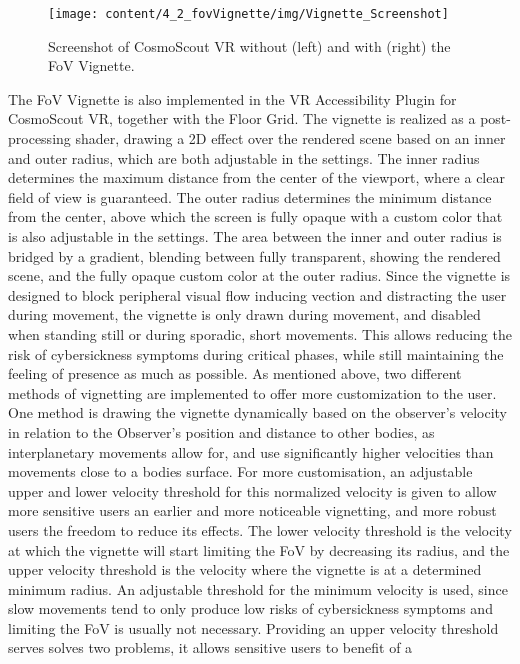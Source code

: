 \begin{figure}[h]
    \centering
    \texttt{[image: content/4\_2\_fovVignette/img/Vignette\_Screenshot]}
    \caption{Screenshot of CosmoScout VR without (left) and with (right) the FoV Vignette.}
    \label{fig:fov-vignette-screenshot}
\end{figure}
The FoV Vignette is also implemented in the VR Accessibility Plugin for CosmoScout VR, together with the Floor Grid.
The vignette is realized as a post-processing shader, drawing a 2D effect over the rendered scene based on an
inner and outer radius, which are both adjustable in the settings.
The inner radius determines the maximum distance from the center of the viewport, where a clear field of view is
guaranteed.
The outer radius determines the minimum distance from the center, above which the screen is fully opaque with a custom
color that is also adjustable in the settings.
The area between the inner and outer radius is bridged by a gradient, blending between fully transparent, showing the
rendered scene, and the fully opaque custom color at the outer radius.
Since the vignette is designed to block peripheral visual flow inducing vection and distracting the user during
movement, the vignette is only drawn during movement, and disabled when standing still or during sporadic, short
movements.
This allows reducing the risk of cybersickness symptoms during critical phases, while still maintaining the feeling
of presence as much as possible.
As mentioned above, two different methods of vignetting are implemented to offer more customization to the user.
One method is drawing the vignette dynamically based on the observer's velocity in relation to the Observer's
position and distance to other bodies, as interplanetary movements allow for, and use significantly higher
velocities than movements close to a bodies surface.
For more customisation, an adjustable upper and lower velocity threshold for this normalized velocity is given to
allow more sensitive users an earlier and more noticeable vignetting, and more robust users the freedom to reduce its
effects.
The lower velocity threshold is the velocity at which the vignette will start limiting the FoV by decreasing its
radius, and the upper velocity threshold is the velocity where the vignette is at a determined minimum radius.
An adjustable threshold for the minimum velocity is used, since slow movements tend to only produce low risks of
cybersickness symptoms and limiting the FoV is usually not necessary.
Providing an upper velocity threshold serves solves two problems, it allows sensitive users to benefit of a
